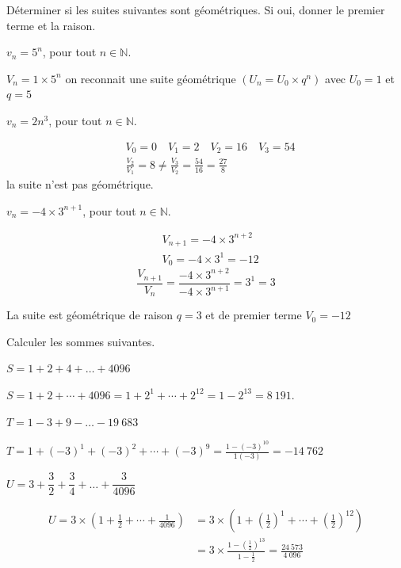 \documentclass[12pt,a4paper]{article}  %
\begin{document}

Déterminer si les suites suivantes sont géométriques. Si oui, donner le premier terme et la raison.

\begin{enumMet}
	\item {} $v_n=5^n$, pour tout $n \in \mathbb{N}$.
	\begin{corrBox}
		$V_n=1 \times 5^n$ on reconnait une suite géométrique $\left(U_n=U_0 \times q^n\right)$ avec $U_0=1$ et $q=5$		
	\end{corrBox}
	\item $v_n=2n^3$, pour tout $n \in \mathbb{N}$.
	\begin{corrBox}
		$$
		\begin{aligned}
			& V_0=0 \quad V_1=2 \quad V_2=16 \quad V_3=54 \\
			& \frac{V_2}{V_1}=8 \neq \frac{V_3}{V_2}=\frac{54}{16}=\frac{27}{8}
		\end{aligned}
		$$
		la suite n'est pas géométrique.		
	\end{corrBox}
	\item $v_n=-4 \times 3^{n+1}$, pour tout $n \in \mathbb{N}$.
	\begin{corrBox}
		$$
		\begin{aligned}
			& V_{n+1}=-4 \times 3^{n+2} \\
			& V_0=-4 \times 3^1=-12
		\end{aligned}
		$$
		$$
		\frac{V_{n+1}}{V_n}=\frac{-4 \times 3^{n+2}}{-4 \times 3^{n+1}}=3^1=3
		$$
		
		La suite est géométrique de raison $q=3$ et de premier terme $V_0=-12$		
	\end{corrBox}
\end{enumMet}


Calculer les sommes suivantes.
	\begin{enumMet}
		\item {} $S=1+2+4+\ldots+4096$
		\begin{corrBox}
			$S=1+2+\cdots+4096=1+2^1+\cdots+2^{12}=1-2^{13}=8\ 191$.
		\end{corrBox}
		\item $T=1-3+9-\ldots-19\ 683$
		\begin{corrBox}
			$T=1+(-3)^1+(-3)^2+\cdots+(-3)^9=\frac{1-(-3)^{10}}{1(-3)}=-14\ 762$			
		\end{corrBox}
		\item $U=3+\dfrac{3}{2}+\dfrac{3}{4}+\ldots+\dfrac{3}{4096}$
		\begin{corrBox}
			$$
			\begin{aligned}
				U=3 \times\left(1+\frac{1}{2}+\cdots+\frac{1}{4096}\right) & =3 \times\left(1+\left(\frac{1}{2}\right)^1+\cdots+\left(\frac{1}{2}\right)^{12}\right) \\
				& =3 \times \frac{1-\left(\frac{1}{2}\right)^{13}}{1-\frac{1}{2}}=\frac{24\ 573}{4\ 096}
			\end{aligned}
			$$		
		\end{corrBox}
	\end{enumMet}
\end{document}
